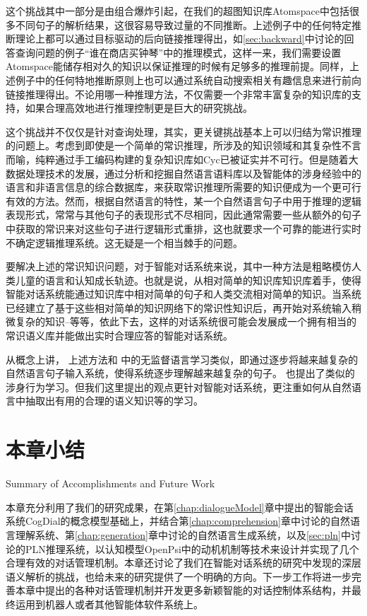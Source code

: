 这个挑战其中一部分是由组合爆炸引起，在我们的超图知识库Atomspace中包括很多不同句子的解析结果，这很容易导致过量的不同推断。上述例子中的任何特定推断理论上都可以通过目标驱动的后向链接推理得出，如\ref{sec:backward}中讨论的回答查询问题的例子“谁在商店买钟琴”中的推理模式，这样一来，我们需要设置Atomspace能储存相对久的知识以保证推理的时候有足够多的推理前提。同样，上述例子中的任何特地推断原则上也可以通过系统自动搜索相关有趣信息来进行前向链接推理得出。不论用哪一种推理方法，不仅需要一个非常丰富复杂的知识库的支持，如果合理高效地进行推理控制更是巨大的研究挑战。

这个挑战并不仅仅是针对查询处理，其实，更关键挑战基本上可以归结为常识推理的问题上\cite{RWR}。考虑到即使是一个简单的常识推理，所涉及的知识领域和其复杂性不言而喻，纯粹通过手工编码构建的复杂知识库如Cyc\cite{Lenat1990}已被证实并不可行。但是随着大数据处理技术的发展，通过分析和挖掘自然语言语料库以及智能体的涉身经验中的语言和非语言信息的综合数据库，来获取常识推理所需要的知识便成为一个更可行有效的方法。然而，根据自然语言的特性，某一个自然语言句子中用于推理的逻辑表现形式，常常与其他句子的表现形式不尽相同，因此通常需要一些从额外的句子中获取的常识来对这些句子进行逻辑形式重排，这也就要求一个可靠的能进行实时不确定逻辑推理系统。这无疑是一个相当棘手的问题。

要解决上述的常识知识问题，对于智能对话系统来说，其中一种方法是粗略模仿人类儿童的语言和认知成长轨迹。也就是说，从相对简单的知识库知识库着手，使得智能对话系统能通过知识库中相对简单的句子和人类交流相对简单的知识。当系统已经建立了基于这些相对简单的知识网络下的常识性知识后，再开始对系统输入稍微复杂的知识--等等，依此下去，这样的对话系统很可能会发展成一个拥有相当的常识语义库并能做出实时合理应答的智能对话系统。

 从概念上讲， 上述方法和\cite{Spitkovsky2013} 中的无监督语言学习类似，即通过逐步将越来越复杂的自然语言句子输入系统，使得系统逐步理解越来越复杂的句子。 \cite{Goertzel2008w} 也提出了类似的涉身行为学习。但我们这里提出的观点更针对智能对话系统，更注重如何从自然语言中抽取出有用的合理的语义知识等的学习。

\section{本章小结}{Summary of Accomplishments and Future Work}

本章充分利用了我们的研究成果，在第\ref{chap:dialogueModel}章中提出的智能会话系统CogDial的概念模型基础上，并结合第\ref{chap:comprehension}章中讨论的自然语言理解系统、第\ref{chap:generation}章中讨论的自然语言生成系统，以及\ref{sec:pln}中讨论的PLN推理系统，以认知模型OpenPsi中的动机机制等技术来设计并实现了几个合理有效的对话管理机制。本章还讨论了我们在智能对话系统的研究中发现的深层语义解析的挑战，也给未来的研究提供了一个明确的方向。下一步工作将进一步完善本章中提出的各种对话管理机制并开发更多新颖智能的对话控制体系结构，并最终运用到机器人或者其他智能体软件系统上。


